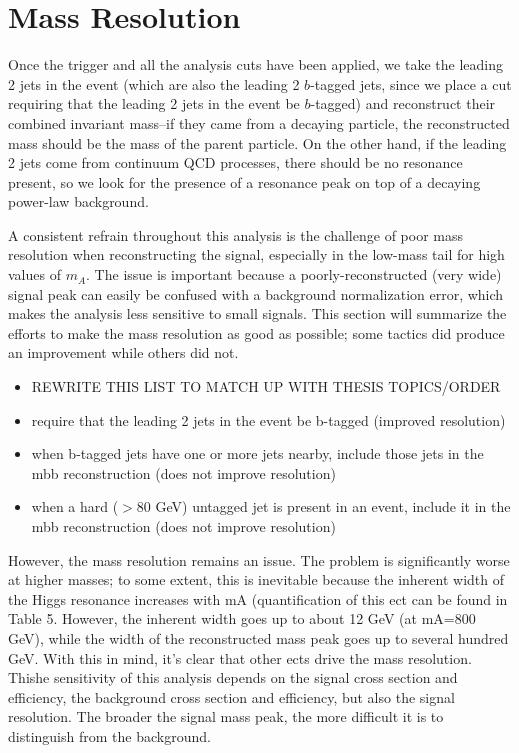 \section{Mass Resolution}
Once the trigger and all the analysis cuts have been applied, we take the leading 2 jets in the event (which are also the leading 2 $b$-tagged jets, since we place a cut requiring that the leading 2 jets in the event be $b$-tagged) and reconstruct their combined invariant mass--if they came from a decaying particle, the reconstructed mass should be the mass of the parent particle.  On the other hand, if the leading 2 jets come from continuum QCD processes, there should be no resonance present, so we look for the presence of a resonance peak on top of a decaying power-law background.


A consistent refrain throughout this analysis is the challenge of poor mass resolution when reconstructing
the signal, especially in the low-mass tail for high values of $m_A$. The issue is important because a poorly-reconstructed (very wide)
signal peak can easily be confused with a background normalization error, which makes the analysis less
sensitive to small signals. This section will summarize the efforts to make the mass resolution as good
as possible; some tactics did produce an improvement while others did not.

\begin{itemize}
    \item REWRITE THIS LIST TO MATCH UP WITH THESIS TOPICS/ORDER
    \item require that the leading 2 jets in the event be b-tagged (improved resolution)
    \item when b-tagged jets have one or more jets nearby, include those jets in the mbb reconstruction (does
not improve resolution)
    \item when a hard ($>$80 GeV) untagged jet is present in an event, include it in the mbb reconstruction
(does not improve resolution)
\end{itemize}
However, the mass resolution remains an issue. The problem is significantly worse at higher masses;
to some extent, this is inevitable because the inherent width of the Higgs resonance increases with mA
(quantification of this ect can be found in Table 5. However, the inherent width goes up to about 12
GeV (at mA=800 GeV), while the width of the reconstructed mass peak goes up to several hundred GeV.
With this in mind, it’s clear that other ects drive the mass resolution. Thishe sensitivity of this analysis depends on the signal cross section and efficiency, the background cross section and efficiency, but also the signal resolution.  The broader the signal mass peak, the more difficult it is to distinguish from the background.  

